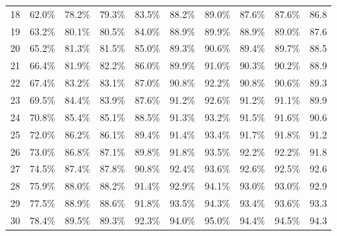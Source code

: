 \begin{table}[h]
\begin{center}
\begin{tabular}{c|p{1.2cm}p{1.1cm}p{1.1cm}p{1.7cm}p{1.5cm}p{1.2cm}p{1.2cm}p{1.2cm}p{1.2cm}}
	18 & 62.0\% & 78.2\% & 79.3\% & 83.5\% & 88.2\% & 89.0\% & 87.6\% & 87.6\% & 86.8 \\ 
	19 & 63.2\% & 80.1\% & 80.5\% & 84.0\% & 88.9\% & 89.9\% & 88.9\% & 89.0\% & 87.6 \\ 
	20 & 65.2\% & 81.3\% & 81.5\% & 85.0\% & 89.3\% & 90.6\% & 89.4\% & 89.7\% & 88.5 \\ 
	21 & 66.4\% & 81.9\% & 82.2\% & 86.0\% & 89.9\% & 91.0\% & 90.3\% & 90.2\% & 88.9 \\ 
	22 & 67.4\% & 83.2\% & 83.1\% & 87.0\% & 90.8\% & 92.2\% & 90.8\% & 90.6\% & 89.3 \\ 
	23 & 69.5\% & 84.4\% & 83.9\% & 87.6\% & 91.2\% & 92.6\% & 91.2\% & 91.1\% & 89.9 \\ 
	24 & 70.8\% & 85.4\% & 85.1\% & 88.5\% & 91.3\% & 93.2\% & 91.5\% & 91.6\% & 90.6 \\ 
	25 & 72.0\% & 86.2\% & 86.1\% & 89.4\% & 91.4\% & 93.4\% & 91.7\% & 91.8\% & 91.2 \\ 
	26 & 73.0\% & 86.8\% & 87.1\% & 89.8\% & 91.8\% & 93.5\% & 92.2\% & 92.2\% & 91.8 \\ 
	27 & 74.5\% & 87.4\% & 87.8\% & 90.8\% & 92.4\% & 93.6\% & 92.6\% & 92.5\% & 92.6 \\ 
	28 & 75.9\% & 88.0\% & 88.2\% & 91.4\% & 92.9\% & 94.1\% & 93.0\% & 93.0\% & 92.9 \\ 
	29 & 77.5\% & 88.9\% & 88.6\% & 91.8\% & 93.5\% & 94.3\% & 93.4\% & 93.6\% & 93.3 \\ 
	30 & 78.4\% & 89.5\% & 89.3\% & 92.3\% & 94.0\% & 95.0\% & 94.4\% & 94.5\% & 94.3 \\
	\hline\hline
    \end{tabular}
    \label{tab:media_eigen}
    \end{center}
\end{table}	